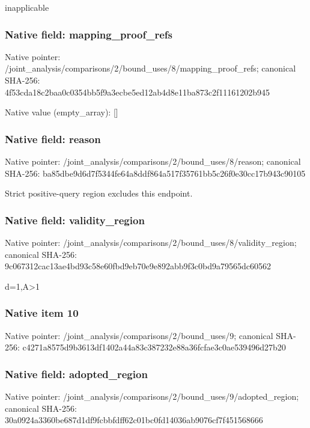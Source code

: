 \documentclass[10pt,a4paper]{article}
\begin{document}
\begingroup\raggedright\sloppy inapplicable\par\endgroup

\subsubsection{Native field: mapping\_\allowbreak{}proof\_\allowbreak{}refs}
Native pointer: /joint\_\allowbreak{}analysis/comparisons/2/bound\_\allowbreak{}uses/8/mapping\_\allowbreak{}proof\_\allowbreak{}refs; canonical SHA-256: 4f53cda18c2baa0c0354bb5f9a3ecbe5ed12ab4d8e11ba873c2f11161202b945

Native value (empty\_\allowbreak{}array): []

\subsubsection{Native field: reason}
Native pointer: /joint\_\allowbreak{}analysis/comparisons/2/bound\_\allowbreak{}uses/8/reason; canonical SHA-256: ba85dbe9d6d7f5344fe64a8ddf864a517f35761bb5c26f0e30cc17b943c90105

\begingroup\raggedright\sloppy Strict positive-query region excludes this endpoint.\par\endgroup

\subsubsection{Native field: validity\_\allowbreak{}region}
Native pointer: /joint\_\allowbreak{}analysis/comparisons/2/bound\_\allowbreak{}uses/8/validity\_\allowbreak{}region; canonical SHA-256: 9c067312cac13ae4bd93c58e60fbd9eb70e9e892abb9f3c0bd9a79565dc60562

\begingroup\raggedright\sloppy d=\allowbreak{}1,\allowbreak{}A>1\par\endgroup

\subsubsection{Native item 10}
Native pointer: /joint\_\allowbreak{}analysis/comparisons/2/bound\_\allowbreak{}uses/9; canonical SHA-256: c4271a8575d9b3613df1402a44a83c387232e88a36fcfae3c0ae539496d27b20

\subsubsection{Native field: adopted\_\allowbreak{}region}
Native pointer: /joint\_\allowbreak{}analysis/comparisons/2/bound\_\allowbreak{}uses/9/adopted\_\allowbreak{}region; canonical SHA-256: 30a0924a3360be687d1df9fcbbfdff62c01bc0fd14036ab9076cf7f451568666
\end{document}
